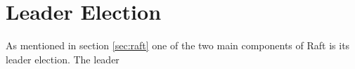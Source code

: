 \section{Leader Election} %
\label{sec:leader_election}
As mentioned in section \ref{sec:raft} one of the two main components of Raft is its leader election. The leader 

